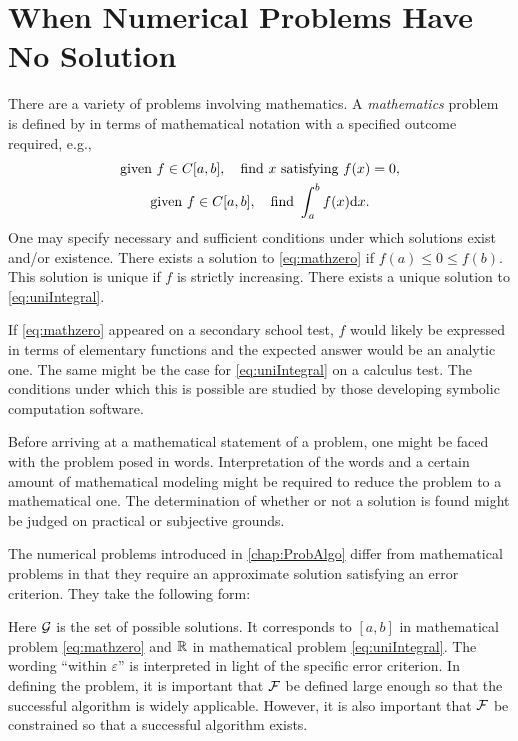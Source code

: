 \chapter{When Numerical Problems Have No Solution} \label{chap:NoSolution}

There are a variety of problems involving mathematics.  A \emph{mathematics} problem is defined by in terms of mathematical notation with a specified outcome required, e.g., 
\begin{gather}\label{eq:mathzero}
    \text{given } f \in C[a,b],  \quad \text{find } x \text{ satisfying } f(x) = 0, \\
    \label{eq:uniIntegral}
    \text{given } f \in C[a,b],  \quad \text{find } \int_a^b f(x) {\rm d} x.
\end{gather} 
One may specify necessary and sufficient conditions under which solutions exist and/or existence.  There exists a solution to \eqref{eq:mathzero} if $f(a) \le 0 \le f(b)$.  This solution is unique if $f$ is strictly increasing.  There exists a unique solution to \eqref{eq:uniIntegral}.

If \eqref{eq:mathzero} appeared on a secondary school test, $f$ would likely be expressed in terms of elementary functions and the expected answer would be an analytic one.  The same might be the case for \eqref{eq:uniIntegral} on a calculus test.  The conditions under which this is possible are studied by those developing symbolic computation software.  

Before arriving at a mathematical statement of a problem, one might be faced with the problem posed in words.  Interpretation of the words and a certain amount of mathematical modeling might be required to reduce the problem to a mathematical one.  The determination of whether or not a solution is found might be judged on practical or subjective grounds.

The numerical problems introduced in \cref{chap:ProbAlgo} differ from mathematical problems in that they require an approximate solution satisfying an error criterion.  They take the following form:
\iffalse
\begin{NumProblem}[Generic Problem]
\label{prob:generalProblem}
\problemspecs{set of functions $\cf$ \\ 
solution operator $\sol: \cf \to \cg$}
{black-box function $f \in \cf$ \\ error tolerance (vector) $\veps$}
{$\out \in \cg$ such that \\ \qquad $\crit(\out,\sol(f),\veps) = \true$}
\end{NumProblem}
\fi
Here $\mathcal{G}$ is the set of possible solutions.  It corresponds to $[a,b]$ in mathematical problem \eqref{eq:mathzero} and $\mathbb{R}$ in mathematical problem \eqref{eq:uniIntegral}.  The wording ``within $\varepsilon$'' is interpreted in light of the specific error criterion.
In defining the problem, it is important that $\cf$ be defined large enough so that the successful algorithm is widely applicable.  However, it is also important that $\cf$ be constrained so that a successful algorithm exists.  

